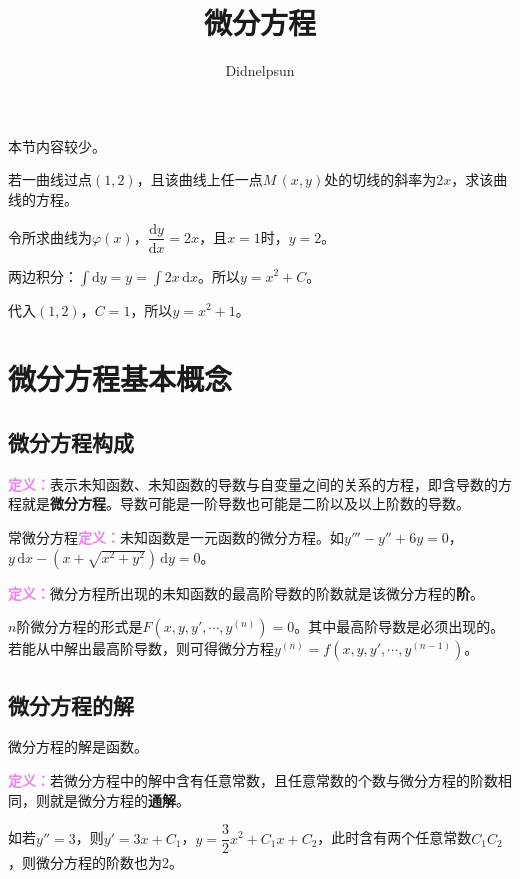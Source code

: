 \documentclass[UTF8, 12pt]{ctexart}
\author{Didnelpsun}
\title{微分方程}
\date{}
\begin{document}
\maketitle
\pagestyle{empty}
\thispagestyle{empty}
\tableofcontents
\thispagestyle{empty}
\newpage
\pagestyle{plain}
\setcounter{page}{1}

本节内容较少。

若一曲线过点$(1,2)$，且该曲线上任一点$M\,(x,y)$处的切线的斜率为$2x$，求该曲线的方程。

令所求曲线为$\varphi(x)$，$\dfrac{\textrm{d}y}{\textrm{d}x}=2x$，且$x=1$时，$y=2$。

两边积分：$\int\textrm{d}y=y=\int2x\,\textrm{d}x$。所以$y=x^2+C$。

代入$(1,2)$，$C=1$，所以$y=x^2+1$。

\section{微分方程基本概念}

\subsection{微分方程构成}

\textcolor{violet}{\textbf{定义：}}表示未知函数、未知函数的导数与自变量之间的关系的方程，即含导数的方程就是\textbf{微分方程}。导数可能是一阶导数也可能是二阶以及以上阶数的导数。

常微分方程\textcolor{violet}{\textbf{定义：}}未知函数是一元函数的微分方程。如$y'''-y''+6y=0$，$y\,\textrm{d}x-(x+\sqrt{x^2+y^2})\,\textrm{d}y=0$。

\textcolor{violet}{\textbf{定义：}}微分方程所出现的未知函数的最高阶导数的阶数就是该微分方程的\textbf{阶}。

$n$阶微分方程的形式是$F(x,y,y',\cdots,y^{(n)})=0$。其中最高阶导数是必须出现的。若能从中解出最高阶导数，则可得微分方程$y^{(n)}=f(x,y,y',\cdots,y^{(n-1)})$。

\subsection{微分方程的解}

微分方程的解是函数。

\textcolor{violet}{\textbf{定义：}}若微分方程中的解中含有任意常数，且任意常数的个数与微分方程的阶数相同，则就是微分方程的\textbf{通解}。

如若$y''=3$，则$y'=3x+C_1$，$y=\dfrac{3}{2}x^2+C_1x+C_2$，此时含有两个任意常数$C_1C_2$，则微分方程的阶数也为2。
\end{document}

